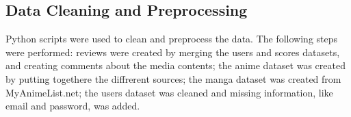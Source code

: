 \subsection{Data Cleaning and Preprocessing}
Python scripts were used to clean and preprocess the data. The following steps were performed:
reviews were created by merging the users and scores datasets, and creating comments about the media contents;
the anime dataset was created by putting togethere the diffrerent sources;
the manga dataset was created from MyAnimeList.net;
the users dataset was cleaned and missing information, like email and password, was added.

